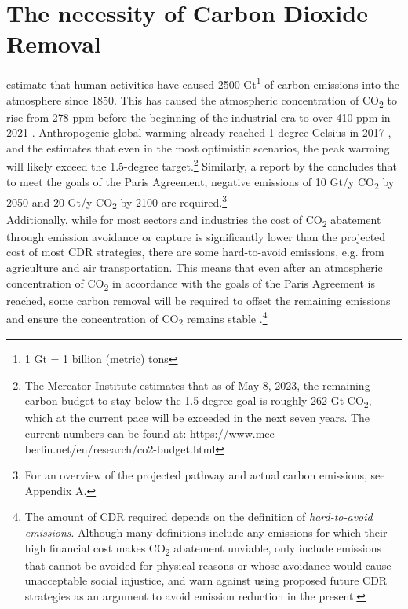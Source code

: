 \section{The necessity of Carbon Dioxide Removal}
\textcite{Bergman2021TheJustice} estimate that human activities have caused 2500 Gt\footnote{ 1 Gt = 1 billion (metric) tons} of carbon emissions into the atmosphere since 1850. This has caused the atmospheric concentration of CO\textsubscript{2} to rise from 278 ppm before the beginning of the industrial era to over 410 ppm in 2021 \parencite{Friedlingstein2022Global2022}. Anthropogenic global warming already reached 1 degree Celsius in 2017 \parencite[6]{IPCC2018Global1.5C}, and the \textcite[30]{UNEP2022Emissions2022} estimates that even in the most optimistic scenarios, the peak warming will likely exceed the 1.5-degree target.\footnote{The Mercator Institute estimates that as of May 8, 2023, the remaining carbon budget to stay below the 1.5-degree goal is roughly 262 Gt CO\textsubscript{2}, which at the current pace will be exceeded in the next seven years. The current numbers can be found at: https://www.mcc-berlin.net/en/research/co2-budget.html} Similarly, a report by the \textcite[9]{NAS2018NegativeAgenda} concludes that to meet the goals of the Paris Agreement, negative emissions of 10 Gt/y CO\textsubscript{2} by 2050 and 20 Gt/y CO\textsubscript{2} by 2100 are required.\footnote{For an overview of the projected pathway and actual carbon emissions, see Appendix A.}\\
Additionally, while for most sectors and industries the cost of CO\textsubscript{2} abatement through emission avoidance or capture is significantly lower than the projected cost of most CDR strategies, there are some hard-to-avoid emissions, e.g. from agriculture and air transportation. This means that even after an atmospheric concentration of CO\textsubscript{2} in accordance with the goals of the Paris Agreement is reached, some carbon removal will be required to offset the remaining emissions and ensure the concentration of CO\textsubscript{2} remains stable \parencite{NRC2015ClimateSequestration}.\footnote{The amount of CDR required depends on the definition of \textit{hard-to-avoid emissions}. Although many definitions include any emissions for which their high financial cost makes CO\textsubscript{2} abatement unviable, \textcite{Bergman2021TheJustice} only include emissions that cannot be avoided for physical reasons or whose avoidance would cause unacceptable social injustice, and warn against using proposed future CDR strategies as an argument to avoid emission reduction in the present.}
